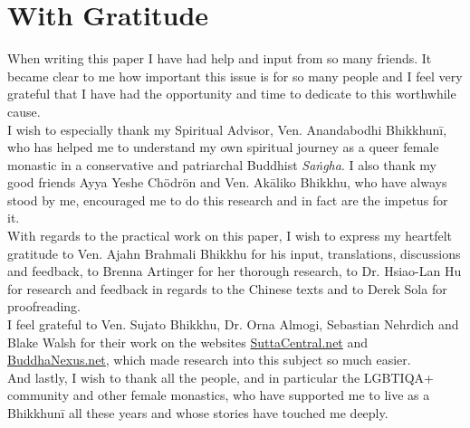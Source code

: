 \section{With Gratitude}

When writing this paper I have had help and input from so many friends. It became clear to me how important this issue is for so many people and I feel very grateful that I have had the opportunity and time to dedicate to this worthwhile cause.\\

I wish to especially thank my Spiritual Advisor, Ven. Anandabodhi Bhikkhunī, who has helped me to understand my own spiritual journey as a queer female monastic in a conservative and patriarchal Buddhist {\em Saṅgha}. I also thank my good friends Ayya Yeshe Chödrön and Ven. Akāliko Bhikkhu, who have always stood by me, encouraged me to do this research and in fact are the impetus for it.\\

With regards to the practical work on this paper, I wish to express my heartfelt gratitude to Ven. Ajahn Brahmali Bhikkhu for his input, translations, discussions and feedback, to Brenna Artinger for her thorough research, to Dr. Hsiao-Lan Hu for research and feedback in regards to the Chinese texts and to Derek Sola for proofreading.\\

I feel grateful to Ven. Sujato Bhikkhu, Dr. Orna Almogi, Sebastian Nehrdich and Blake Walsh for their work on the websites \href{https://suttacentral.net/}{SuttaCentral.net} and \href{https://buddhanexus.net/}{BuddhaNexus.net}, which made research into this subject so much easier.\\

And lastly, I wish to thank all the people, and in particular the LGBTIQA+ community and other female monastics, who have supported me to live as a Bhikkhunī all these years and whose stories have touched me deeply.
